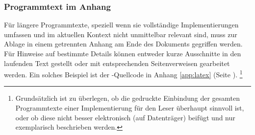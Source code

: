\subsubsection{Programmtext im Anhang}

Für längere Programmtexte, speziell wenn sie vollständige
Implementierungen umfassen und im aktuellen Kontext nicht
unmittelbar relevant sind, muss zur Ablage in einem getrennten
Anhang am Ende des Dokuments gegriffen werden. Für Hinweise auf bestimmte
Details können entweder kurze Ausschnitte in den laufenden Text
gestellt oder mit entsprechenden Seitenverweisen gearbeitet werden. Ein
solches Beispiel ist der \latex-Quellcode in Anhang
\ref{app:latex} (Seite \pageref{app:latex}).%
\footnote{%
Grundsätzlich ist zu überlegen, ob die gedruckte Einbindung der gesamten
Programmtexte einer Implementierung für den Leser überhaupt sinnvoll ist, oder
ob diese nicht besser elektronisch (auf Datenträger) beifügt und nur exemplarisch
beschrieben werden.}
